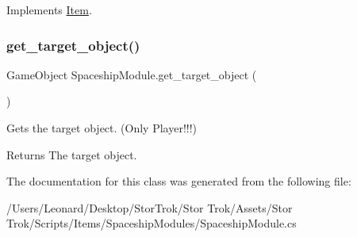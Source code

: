 Implements \hyperlink{class_item_ab868f8ccad92378f7352e3a9e0f755ff}{Item}.

\mbox{\label{class_spaceship_module_a49cfd4d32ed594c4aa7f123d2828f857}} 
\subsubsection{\texorpdfstring{get\+\_\+target\+\_\+object()}{get\_target\_object()}}
{\footnotesize\ttfamily Game\+Object Spaceship\+Module.\+get\+\_\+target\+\_\+object (\begin{DoxyParamCaption}{ }\end{DoxyParamCaption})}



Gets the target object. (Only Player!!!) 

\begin{DoxyReturn}{Returns}
The target object.
\end{DoxyReturn}


The documentation for this class was generated from the following file\+:\begin{DoxyCompactItemize}
\item 
/\+Users/\+Leonard/\+Desktop/\+Stor\+Trok/\+Stor Trok/\+Assets/\+Stor Trok/\+Scripts/\+Items/\+Spaceship\+Modules/Spaceship\+Module.\+cs\end{DoxyCompactItemize}
